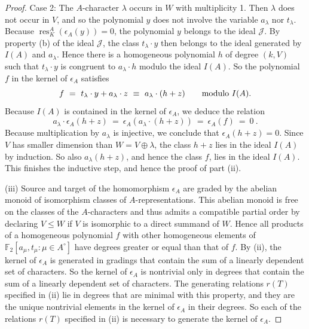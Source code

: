 \documentclass[10pt,a4paper]{amsart}
\DeclareMathOperator{\res}{res}
\newcommand{\Jc}{{\mathcal J}}
\newcommand{\mF}{{\mathbb F}}
\begin{document}
\begin{proof}
  Case 2: The $A$-character $\lambda$ occurs in $W$ with multiplicity 1.
  Then $\lambda$ does not occur in $V$, and so the polynomial $y$
  does not involve the variable $a_\lambda$ nor $t_\lambda$.
  Because $\res^A_K(\epsilon_A(y))=0$, the polynomial $y$ belongs to the ideal $\Jc$.
  By property (b) of the ideal $\Jc$, the class $t_\lambda \cdot y$ then belongs
  to the ideal generated by $I(A)$ and $a_\lambda$.
  Hence there is a homogeneous polynomial $h$ of degree $(k,V)$
  such that $t_\lambda\cdot y$ is congruent to $a_\lambda\cdot h$ modulo the ideal $I(A)$.
  So the polynomial $f$ in the kernel of $\epsilon_A$ satisfies
  \[ f\ = \ t_\lambda\cdot y + a_\lambda\cdot z\ \equiv \ a_\lambda\cdot (h+z)  \text{\qquad modulo $I(A)$.}\]
  Because $I(A)$ is contained in the kernel of $\epsilon_A$, we deduce the relation
  \[ a_\lambda\cdot\epsilon_A(h+z) \ = \  \epsilon_A(a_\lambda\cdot(h+z)) \ = \ \epsilon_A(f) \ = \  0 \ .\]
  Because multiplication by $a_\lambda$ is injective, we conclude that $\epsilon_A(h+z)=0$.
  Since $V$ has smaller dimension than $W=V\oplus \lambda$, the class $h+z$
  lies in the ideal $I(A)$ by induction. So also $a_\lambda(h+z)$, and hence the class $f$,
  lies in the ideal $I(A)$. This finishes the inductive step, and hence the proof of part (ii).

  (iii)
  Source and target of the homomorphism $\epsilon_A$
  are graded by the abelian monoid of isomorphism classes of $A$-representations.
  This abelian monoid is free on the classes of the $A$-characters
  and thus admits a compatible partial order by declaring $V\leq W$
  if $V$ is isomorphic to a direct summand of $W$.
  Hence all products of a homogeneous polynomial $f$ with other homogeneous elements of
  $\mF_2[a_\mu,t_\mu\colon \mu\in A^\circ]$ have degrees greater or equal than that of $f$.
  By (ii), the kernel of $\epsilon_A$ is generated in gradings 
  that contain the sum of a linearly dependent set of characters.
  So the kernel of $\epsilon_A$ is nontrivial only in degrees 
  that contain the sum of a linearly dependent set of characters.
  The generating relations $r(T)$ specified in (ii) lie in degrees
  that are minimal with this property, and they are the unique nontrivial
  elements in the kernel of $\epsilon_A$ in their degrees.
  So each of the relations $r(T)$ specified in (ii) is necessary to generate
  the kernel of $\epsilon_A$.
\end{proof}
\end{document}
